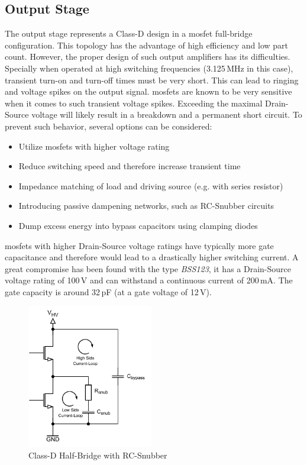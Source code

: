 \subsection{Output Stage}
The output stage represents a Class-D design in a \acrshort{mosfet} full-bridge configuration. This topology has the advantage of high efficiency and low part count. However, the proper design of such output amplifiers has its difficulties. Specially when operated at high switching frequencies (3.125\,MHz in this case), transient turn-on and turn-off times must be very short. This can lead to ringing and voltage spikes on the output signal.
\acrshort{mosfet}s are known to be very sensitive when it comes to such transient voltage spikes. Exceeding the maximal Drain-Source voltage will likely result in a breakdown and a permanent short circuit. To prevent such behavior, several options can be considered:

\begin{itemize}
    \item Utilize \acrshort{mosfet}s with higher voltage rating
    \item Reduce switching speed and therefore increase transient time
    \item Impedance matching of load and driving source (e.g. with series resistor)
    \item Introducing passive dampening networks, such as RC-Snubber circuits
    \item Dump excess energy into bypass capacitors using clamping diodes
\end{itemize}
\newpage

\acrshort{mosfet}s with higher Drain-Source voltage ratings have typically more gate capacitance and therefore would lead to a drastically higher switching current. A great compromise has been found with the type \textit{BSS123}, it has a Drain-Source voltage rating of 100\,V and can withstand a continuous current of 200\,mA. The gate capacity is around 32\,pF (at a gate voltage of 12\,V). 

\begin{figure}[h!]
	\centering
	\includegraphics[width=5.5cm]{images/4_Design/Hardware/Class D Snubber.pdf}
	\vspace{-0.2cm}
    \caption{Class-D Half-Bridge with RC-Snubber}
    \label{fig:rc-snubber}
\end{figure}

